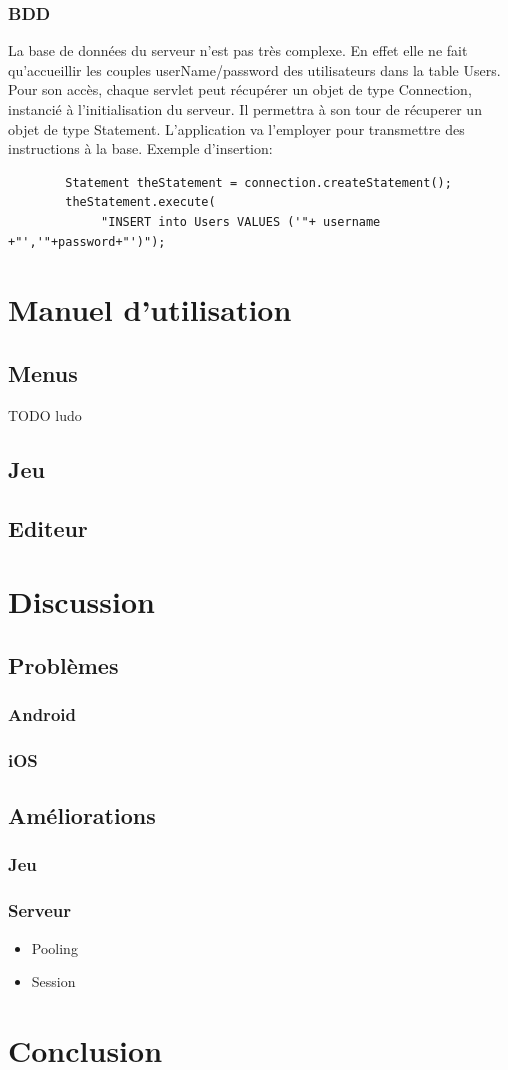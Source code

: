 \documentclass[a4paper,11pt]{report}
\begin{document}
		\subsection{BDD}
		La base de données du serveur n'est pas très complexe. En effet elle ne fait
		qu'accueillir les couples userName/password des utilisateurs dans la
		table Users. 
		Pour son accès, chaque servlet peut récupérer un objet de type Connection,
		instancié à l'initialisation du serveur. Il permettra à son tour
		de récuperer un objet de type Statement. L'application va l'employer pour
		transmettre des instructions à la base. Exemple d'insertion: 
		
		\begin{verbatim}
		Statement theStatement = connection.createStatement();
		theStatement.execute(
		     "INSERT into Users VALUES ('"+ username +"','"+password+"')");
		\end{verbatim}
		
		
		
		
\chapter{Manuel d'utilisation}
	\section{Menus}
	TODO ludo
	\section{Jeu}
	\section{Editeur}
	

\chapter{Discussion}
	\section{Problèmes}
		\subsection{Android}
		\subsection{iOS}
	\section{Améliorations}
		\subsection{Jeu}
		\subsection{Serveur}
			\begin{itemize}
				\item{Pooling}
				\item{Session}
			\end{itemize}
			
\chapter{Conclusion}
\end{document}
